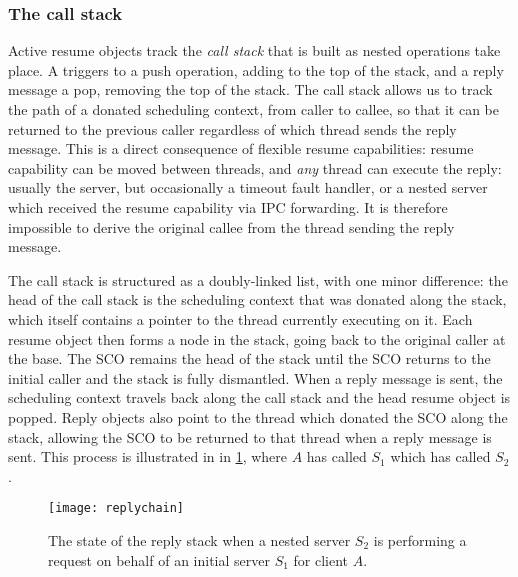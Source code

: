 \subsubsection{The call stack}

Active resume objects track the \emph{call stack} that is built as nested \call operations take
place. A \call triggers to a push operation, adding to the top of the stack, and a reply message a
pop, removing the top of the stack.  The call stack allows us to track the path of a donated
scheduling context, from caller to callee, so that it can be returned to the previous caller
regardless of which thread sends the reply message. This is a direct consequence of flexible resume
capabilities: resume capability can be moved between threads, and \emph{any} thread can execute the
reply: usually the server, but occasionally a timeout fault handler, or a nested server which
received the resume capability via \gls{IPC} forwarding. It is therefore impossible to derive the
original callee from the thread sending the reply message.

The call stack is structured as a doubly-linked list, with one minor difference: the head of the
call stack is the scheduling context that was donated along the stack, which itself contains a
pointer to the thread currently executing on it. Each resume object then forms a node in the
stack, going back to the original caller at the base. The \gls{SCO} remains the head of the stack
until the \gls{SCO} returns to the initial caller and the stack is fully dismantled.  When a reply
message is sent, the scheduling context travels back along the call stack and the head resume object
is popped.  Reply objects also point to the thread which donated the \gls{SCO} along the stack,
allowing the SCO to be returned to that thread when a reply message is sent.  This process is
illustrated in in \cref{f:reply-stack}, where $A$ has called $S_{1}$ which has called  $S_{2}$.

\begin{figure}
    \centering
    \texttt{[image: replychain]}
    \caption{The state of the reply stack when a nested server $S_{2}$ is
performing a request on behalf of an initial server $S_{1}$ for client $A$.}
    \label{f:reply-stack}
\end{figure}

